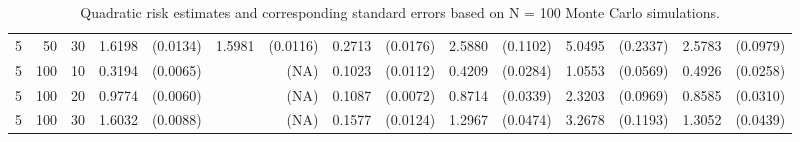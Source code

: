 \begin{table}[ht]
\begin{small}
\begin{tabular}{lrrrrrrrrrrrrrr}
  5 & 50 & 30 & 1.6198 & (0.0134) & 1.5981 & (0.0116) & 0.2713 & (0.0176) & 2.5880 & (0.1102) & 5.0495 & (0.2337) & 2.5783 & (0.0979) \\ 
  5 & 100 & 10 & 0.3194 & (0.0065) &  & (NA) & 0.1023 & (0.0112) & 0.4209 & (0.0284) & 1.0553 & (0.0569) & 0.4926 & (0.0258) \\ 
  5 & 100 & 20 & 0.9774 & (0.0060) &  & (NA) & 0.1087 & (0.0072) & 0.8714 & (0.0339) & 2.3203 & (0.0969) & 0.8585 & (0.0310) \\ 
  5 & 100 & 30 & 1.6032 & (0.0088) &  & (NA) & 0.1577 & (0.0124) & 1.2967 & (0.0474) & 3.2678 & (0.1193) & 1.3052 & (0.0439) \\ 
   \hline
\end{tabular}
\end{small}
\caption{Quadratic risk estimates and corresponding standard errors based on N = 100 Monte Carlo simulations.} 
\end{table}
